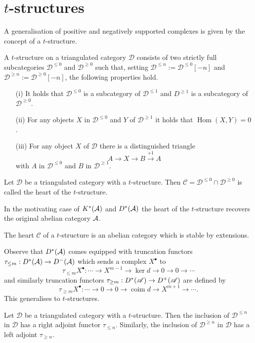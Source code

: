 \section{$t$-structures}
A generalisation of positive and negatively supported complexes is given by the concept of a $t$-structure.
\begin{definition}
 A $t$-structure on a triangulated category $\mathcal{D}$ consists of two strictly full subcategories $\mathcal{D}^{\leq 0}$ and $\mathcal{D}^{\geq 0}$ such that, setting $\mathcal{D}^{\leq n} := \mathcal{D}^{\leq 0}[-n]$ and $\mathcal{D}^{\geq n} := \mathcal{D}^{\geq 0} [-n]$, the following properties hold.
 \begin{enumerate}
   \item[(i)] It holds that $\mathcal{D}^{\leq 0}$ is a subcategory of $\mathcal{D}^{\leq 1}$ and $D^{\geq 1}$ is a subcategory of $\mathcal{D}^{\geq 0}$.
   \item[(ii)] For any objects $X$ in $\mathcal{D}^{\leq 0}$ and $Y$ of $\mathcal{D}^{\geq 1}$ it holds that $\operatorname{Hom}(X,Y) = 0$.
   \item[(iii)] For any object $X$ of $\mathcal{D}$ there is a distinguished triangle
   $$A \to X \to B \xrightarrow{+1} A $$
   with $A$ in $\mathcal{D}^{\leq 0}$ and $B$ in $\mathcal{D}^{\geq 1}$.
 \end{enumerate}
\end{definition}
\begin{definition}
 Let $\mathcal{D}$ be a triangulated category with a $t$-structure. Then $\mathcal{C} = \mathcal{D}^{\leq 0} \cap \mathcal{D}^{\geq 0}$ is called the heart of the $t$-structure.
\end{definition}
In the motivating case of $K^*(\AA)$ and $D^*(\AA)$ the heart of the $t$-structure recovers the original abelian category $\AA$.
\begin{proposition}{\cite[Chapter 5]{dimca2004sheaves}}\label{prop: HeartExtension}
 The heart $\mathcal{C}$ of a $t$-structure is an abelian category which is stable by extensions.
\end{proposition}
Observe that $D^*(\AA)$ comes equipped with truncation functors
$\tau_{\leq m}:D^*(\AA)\to D^-(\AA)$ which sends a complex $X^\bullet$ to
$$\tau_{\leq m}X^\bullet : \cdots \to X^{m-1} \to \ker d \to 0 \to 0 \to \cdots$$
and similarly truncation functors $\tau_{\geq m}:D^*(\A)\to D^{+}(\A)$ are defined by
$$\tau_{\geq m}X^\bullet: \cdots \to 0 \to 0 \to \operatorname{coim} d \to X^{m+1}\to \cdots.$$
This generalises to $t$-structures.
\begin{proposition}{\cite[Chapter 5]{dimca2004sheaves}}
 Let $\mathcal{D}$ be a triangulated category with a $t$-structure.
 Then the inclusion of $\mathcal{D}^{\leq n}$ in $\mathcal{D}$ has a right adjoint functor $\tau_{\leq n}$.
 Similarly, the inclusion of $\mathcal{D}^{\geq n}$ in $\mathcal{D}$ has a left adjoint $\tau_{\geq n}$.
\end{proposition}
